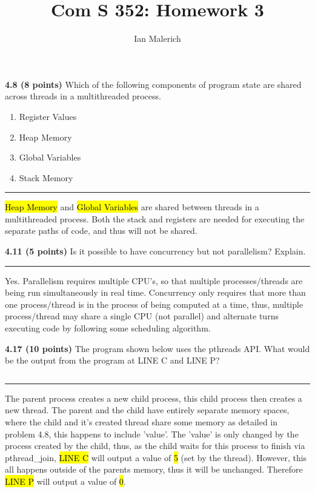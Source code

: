 \documentclass[12pt]{jhwhw}
\author{Ian Malerich}
\title{Com S 352: Homework 3}
\begin{document}
\raggedright

\textbf{4.8 (8 points)}  Which of the following components of program state are 
	shared across threads in a multithreaded process.
	\begin{enumerate}
		\item Register Values
		\item Heap Memory
		\item Global Variables
		\item Stack Memory
	\end{enumerate}
\textcolor[RGB]{240,240,240}{\rule{\textwidth}{0.5pt}}\bigbreak

	\begin{addmargin}[1em]{}
		\hl{Heap Memory} and \hl{Global Variables} are shared between threads in a 
		multithreaded process. 
		Both the stack and registers are needed for executing the separate
		paths of code, and thus will not be shared.
	\end{addmargin}
	\bigbreak

\textbf{4.11 (5 points)} Is it possible to have concurrency but not parallelism?
	Explain.
\textcolor[RGB]{240,240,240}{\rule{\textwidth}{0.5pt}}\bigbreak

	\begin{addmargin}[1em]{}
		Yes. Parallelism requires multiple CPU's, so that multiple processes/threads
		are being run simultaneously in real time. Concurrency only requires that more
		than one process/thread is in the process of being computed at a time, thus,
		multiple process/thread may share a single CPU (not parallel) and alternate
		turns executing code by following some scheduling algorithm.
	\end{addmargin}
	\bigbreak

\textbf{4.17 (10 points)} The program shown below uses the pthreads API. 
	What would be the output from the program at LINE C and LINE P?
\inputminted{c}{4.17.c}
\textcolor[RGB]{240,240,240}{\rule{\textwidth}{0.5pt}}\bigbreak

	\begin{addmargin}[1em]{}
		The parent process creates a new child process, this child process
		then  creates a new thread. The parent and the child have entirely separate
		memory spaces, where the child and it's created thread share some memory
		as detailed in problem 4.8, this happens to include 'value'.
		The 'value' is only changed by the process created by the child, thus,
		as the child waits for this process to finish via
		pthread_join, \hl{LINE C} will output a value of \hl{5} (set by the thread).
		However, this all happens outside of the parents memory, thus it will be unchanged.
		Therefore \hl{LINE P} will output a value of \hl{0}.
	\end{addmargin}
	\bigbreak
\end{document}
